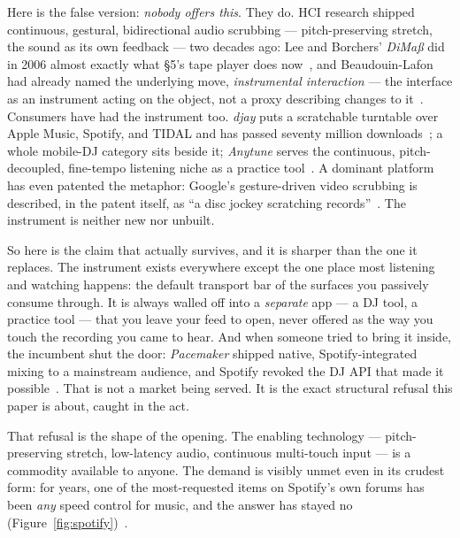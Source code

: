 \documentclass[10pt,letterpaper,twocolumn]{article}
\begin{document}
Here is the false version: \emph{nobody offers this}. They do. HCI research shipped continuous, gestural, bidirectional audio scrubbing --- pitch-preserving stretch, the sound as its own feedback --- two decades ago: Lee and Borchers' \emph{DiMaß} did in 2006 almost exactly what \S5's tape player does now~\citep{lee2006dimass}, and Beaudouin-Lafon had already named the underlying move, \emph{instrumental interaction} --- the interface as an instrument acting on the object, not a proxy describing changes to it~\citep{beaudouinlafon2000instrumental}. Consumers have had the instrument too. \emph{djay} puts a scratchable turntable over Apple Music, Spotify, and TIDAL and has passed seventy million downloads~\citep{algoriddim2024djay}; a whole mobile-DJ category sits beside it; \emph{Anytune} serves the continuous, pitch-decoupled, fine-tempo listening niche as a practice tool~\citep{anytune2024}. A dominant platform has even patented the metaphor: Google's gesture-driven video scrubbing is described, in the patent itself, as ``a disc jockey scratching records''~\citep{google2019scrubbingvideo}. The instrument is neither new nor unbuilt.

So here is the claim that actually survives, and it is sharper than the one it replaces. The instrument exists everywhere except the one place most listening and watching happens: the default transport bar of the surfaces you passively consume through. It is always walled off into a \emph{separate} app --- a DJ tool, a practice tool --- that you leave your feed to open, never offered as the way you touch the recording you came to hear. And when someone tried to bring it inside, the incumbent shut the door: \emph{Pacemaker} shipped native, Spotify-integrated mixing to a mainstream audience, and Spotify revoked the DJ API that made it possible~\citep{pacemaker2018}. That is not a market being served. It is the exact structural refusal this paper is about, caught in the act.

That refusal is the shape of the opening. The enabling technology --- pitch-preserving stretch, low-latency audio, continuous multi-touch input --- is a commodity available to anyone. The demand is visibly unmet even in its crudest form: for years, one of the most-requested items on Spotify's own forums has been \emph{any} speed control for music, and the answer has stayed no (Figure~\ref{fig:spotify})~\citep{spotify2026speed}.
\end{document}
